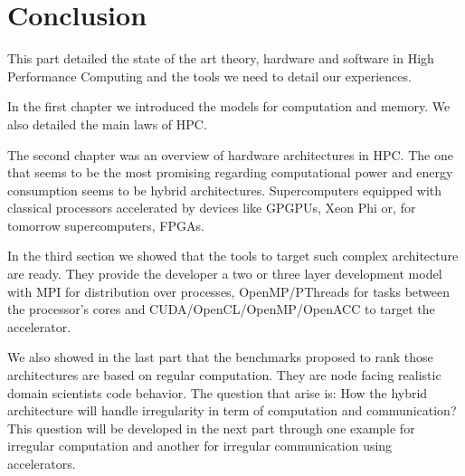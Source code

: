 







\chapter*{Conclusion}
This part detailed the state of the art theory, hardware and software in High Performance Computing and the tools we need to detail our experiences.

In the first chapter we introduced the models for computation and memory. 
We also detailed the main laws of HPC. 

The second chapter was an overview of hardware architectures in HPC. 
The one that seems to be the most promising regarding computational power and energy consumption seems to be hybrid architectures. 
Supercomputers equipped with classical processors accelerated by devices like GPGPUs, Xeon Phi or, for tomorrow supercomputers, FPGAs. 

In the third section we showed that the tools to target such complex architecture are ready. 
They provide the developer a two or three layer development model with MPI for distribution over processes, OpenMP/PThreads for tasks between the processor's cores and CUDA/OpenCL/OpenMP/OpenACC to target the accelerator. 

We also showed in the last part that the benchmarks proposed to rank those architectures are based on regular computation. 
They are node facing realistic domain scientists code behavior. 
The question that arise is: How the hybrid architecture will handle irregularity in term of computation and communication? 
This question will be developed in the next part through one example for irregular computation and another for irregular communication using accelerators. 



